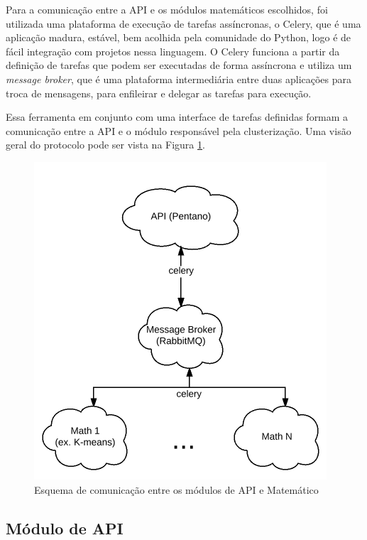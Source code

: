     Para a comunicação entre a API e os módulos matemáticos escolhidos, foi utilizada
    uma plataforma de execução de tarefas assíncronas, o Celery\footnotemark, que é uma aplicação
    madura, estável, bem acolhida pela comunidade do Python, logo é de fácil integração com projetos nessa linguagem.
    O Celery funciona a partir da definição de tarefas que podem ser executadas de forma assíncrona
    e utiliza um \textit{message broker}, que é uma plataforma intermediária
    entre duas aplicações para troca de mensagens, para enfileirar e delegar as tarefas para execução.
    
    Essa ferramenta em conjunto com uma interface de tarefas definidas formam
    a comunicação entre a API e o módulo responsável pela clusterização. 
    Uma visão geral do protocolo pode ser vista na Figura \ref{fig:protocolo}.

    \begin{figure}[bt!]
    \centering
    \includegraphics[scale=0.6]{figuras/protocolo.png}
    \caption{Esquema de comunicação entre os módulos de API e Matemático}
    \label{fig:protocolo}
    \end{figure}
    
    
    \subsection{Módulo de API}

